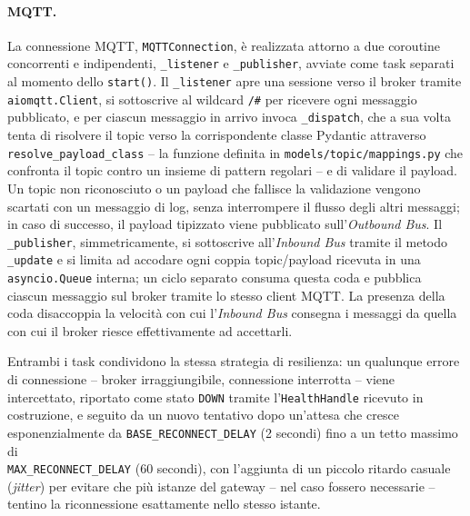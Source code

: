 \paragraph{MQTT.}
La connessione \ac{MQTT}, \texttt{MQTTConnection}, è realizzata attorno a due coroutine concorrenti e indipendenti, \texttt{\_listener} e \texttt{\_publisher}, avviate come task separati al momento dello \texttt{start()}. Il \texttt{\_listener} apre una sessione verso il broker tramite \texttt{aiomqtt.Client}, si sottoscrive al wildcard \texttt{/\#} per ricevere ogni messaggio pubblicato, e per ciascun messaggio in arrivo invoca \texttt{\_dispatch}, che a sua volta tenta di risolvere il topic verso la corrispondente classe Pydantic attraverso \texttt{resolve\_payload\_class} -- la funzione definita in \texttt{models/topic/mappings.py} che confronta il topic contro un insieme di pattern regolari -- e di validare il payload. Un topic non riconosciuto o un payload che fallisce la validazione vengono scartati con un messaggio di log, senza interrompere il flusso degli altri messaggi; in caso di successo, il payload tipizzato viene pubblicato sull'\textit{Outbound Bus}. Il \texttt{\_publisher}, simmetricamente, si sottoscrive all'\textit{Inbound Bus} tramite il metodo \texttt{\_update} e si limita ad accodare ogni coppia topic/payload ricevuta in una \texttt{asyncio.Queue} interna; un ciclo separato consuma questa coda e pubblica ciascun messaggio sul broker tramite lo stesso client \ac{MQTT}. La presenza della coda disaccoppia la velocità con cui l'\textit{Inbound Bus} consegna i messaggi da quella con cui il broker riesce effettivamente ad accettarli.

Entrambi i task condividono la stessa strategia di resilienza: un qualunque errore di connessione -- broker irraggiungibile, connessione interrotta -- viene intercettato, riportato come stato \texttt{DOWN} tramite l'\texttt{HealthHandle} ricevuto in costruzione, e seguito da un nuovo tentativo dopo un'attesa che cresce esponenzialmente da \texttt{BASE\_RECONNECT\_DELAY} (2 secondi) fino a un tetto massimo di \\\texttt{MAX\_RECONNECT\_DELAY} (60 secondi), con l'aggiunta di un piccolo ritardo casuale (\textit{jitter}) per evitare che più istanze del gateway -- nel caso fossero necessarie -- tentino la riconnessione esattamente nello stesso istante.

